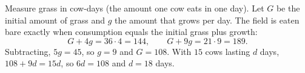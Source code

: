 Measure grass in cow-days (the amount one cow eats in one day). Let $G$ be the initial amount of grass and $g$ the amount that grows per day. The field is eaten bare exactly when consumption equals the initial grass plus growth:
\[G+4g=36\cdot4=144,\qquad G+9g=21\cdot9=189.\]
Subtracting, $5g=45$, so $g=9$ and $G=108$. With $15$ cows lasting $d$ days, $108+9d=15d$, so $6d=108$ and $d=\boxed{18}$ days.
